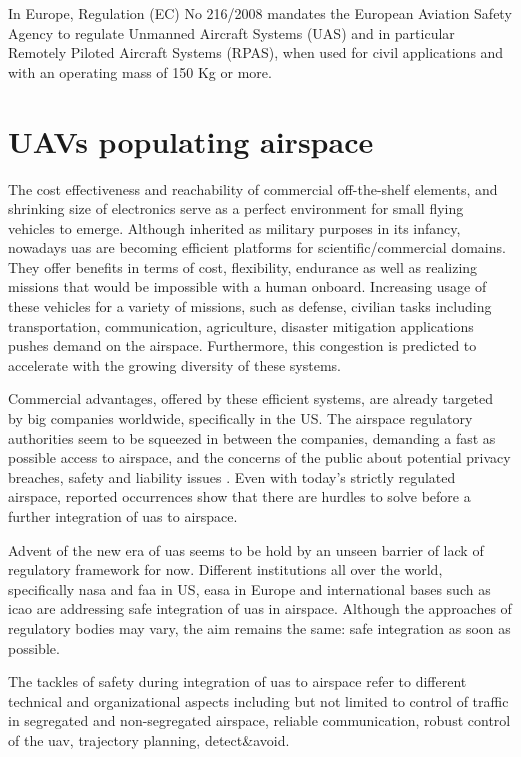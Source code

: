In Europe, Regulation (EC) No 216/2008 mandates the European Aviation Safety Agency 
to regulate Unmanned Aircraft Systems (UAS) and in particular Remotely Piloted Aircraft 
Systems (RPAS), when used for civil applications and with an operating mass of 150 Kg or more.

\section{UAVs populating airspace}\label{ch2:certificationOfAnalyticalApproaches}

The cost effectiveness and reachability of commercial off-the-shelf elements, and 
shrinking size of electronics serve as a perfect environment for small flying vehicles 
to emerge. Although inherited as military purposes in its infancy, nowadays \gls{uas} 
are becoming efficient platforms for scientific/commercial domains. They offer 
benefits in terms of cost, flexibility, endurance as well as realizing missions that 
would be impossible with a human onboard. 
Increasing usage of these vehicles for a variety of missions, such as defense, 
civilian tasks including transportation, communication, agriculture, disaster mitigation 
applications pushes demand on the airspace. Furthermore, this congestion is predicted 
to accelerate with the growing diversity of these systems. 

Commercial advantages, offered by these efficient systems, are already targeted by 
big companies worldwide, specifically in the US. The airspace regulatory authorities 
seem to be squeezed in between the companies, demanding a fast as possible 
access to airspace, and the concerns of the public about potential privacy breaches, 
safety and liability issues \cite{droneDisasters,droneImageProblem}. Even with today's 
strictly regulated airspace, reported occurrences show that there are hurdles to solve 
before a further integration of \gls{uas} to airspace.

Advent of the new era of \gls{uas} seems to be hold by an unseen barrier of lack of 
regulatory framework for now. Different institutions all over the world, specifically \gls{nasa} 
and faa in US, easa in Europe and international bases such as \gls{icao} are addressing 
safe integration of \gls{uas} in airspace. Although the approaches of regulatory bodies 
may vary, the aim remains the same: safe integration as soon as possible. 

The tackles of safety during integration of \gls{uas} to airspace refer to different technical 
and organizational aspects including but not limited to control of traffic in segregated and 
non-segregated airspace, reliable communication, robust control of the \gls{uav}, trajectory planning, detect\&avoid.


